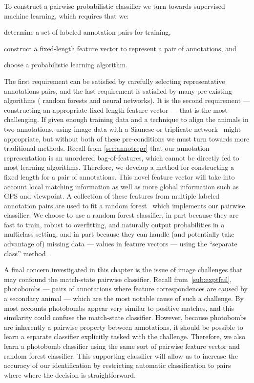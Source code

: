 \MatchStateExample{}

To construct a pairwise probabilistic classifier we turn towards supervised machine learning, which requires that
  we:
\begin{enumin}

    \item determine a set of labeled annotation pairs for training, 

    \item construct a fixed-length feature vector to represent a pair of annotations,  and

    \item choose a probabilistic learning algorithm.
\end{enumin}
The first requirement can be satisfied by carefully selecting representative annotations pairs, and the last
  requirement is satisfied by many pre-existing algorithms (\eg{} random forests and neural networks).
It is the second requirement --- constructing an appropriate fixed-length feature vector --- that is the most
  challenging.
If given enough training data and a technique to align the animals in two annotations, using image data with a
  Siamese or triplicate network~\cite{taigman_deepface_2014,schroff_facenet_2015} might appropriate, but without
  both of these pre-conditions we must turn towards more traditional methods.
Recall from \cref{sec:annotrepr} that our annotation representation is an unordered bag-of-features, which cannot
  be directly fed to most learning algorithms.
Therefore, we develop a method for constructing a fixed length  for a pair of
  annotations.
This novel feature vector will take into account local matching information as well as more global information
  such as GPS and viewpoint.
A collection of these features from multiple labeled annotation pairs are used to fit a random
  forest~\cite{breiman_random_2001} which implements our pairwise classifier.
We choose to use a random forest classifier, in part because they are fast to train, robust to overfitting, and
  naturally output probabilities in a multiclass setting, and in part because they can handle (and potentially take
  advantage of) missing data --- \ie{} \nan{} values in feature vectors --- using the ``separate class''
  method~\cite{ding_investigation_2010}.
  

A final concern investigated in this chapter is the issue of image challenges that may confound the match-state
  pairwise classifier.
Recall from~\cref{sub:exptfail}, {photobombs} --- pairs of annotations where feature correspondences are caused
  by a secondary animal --- which are the most notable cause of such a challenge.
By most accounts photobombs appear very similar to positive matches, and this similarity could confuse the
  match-state classifier.
However, because photobombs are inherently a pairwise property between annotations, it should be possible to
  learn a separate classifier explicitly tasked with the challenge.
Therefore, we also learn a photobomb classifier using the same sort of pairwise feature vector and random forest
  classifier.
This supporting classifier will allow us to increase the accuracy of our identification by restricting automatic
  classification to pairs where where the decision is straightforward.


